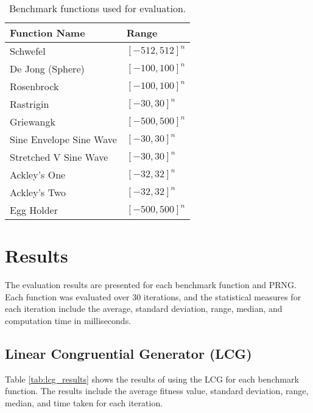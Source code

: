 \documentclass{article}
\begin{document}
\begin{table}[H]
    \centering
    \begin{tabular}{ll}
        \toprule
        Function Name & Range \\
        \midrule
        Schwefel & $[-512, 512]^n$ \\
        De Jong (Sphere) & $[-100, 100]^n$ \\
        Rosenbrock & $[-100, 100]^n$ \\
        Rastrigin & $[-30, 30]^n$ \\
        Griewangk & $[-500, 500]^n$ \\
        Sine Envelope Sine Wave & $[-30, 30]^n$ \\
        Stretched V Sine Wave & $[-30, 30]^n$ \\
        Ackley's One & $[-32, 32]^n$ \\
        Ackley's Two & $[-32, 32]^n$ \\
        Egg Holder & $[-500, 500]^n$ \\
        \bottomrule
    \end{tabular}
    \caption{Benchmark functions used for evaluation.}
    \label{tab:functions}
\end{table}

\section{Results}
The evaluation results are presented for each benchmark function and PRNG. Each function was evaluated over 30 iterations, and the statistical measures for each iteration include the average, standard deviation, range, median, and computation time in milliseconds.

\subsection{Linear Congruential Generator (LCG)}
Table \ref{tab:lcg_results} shows the results of using the LCG for each benchmark function. The results include the average fitness value, standard deviation, range, median, and time taken for each iteration.
\end{document}
